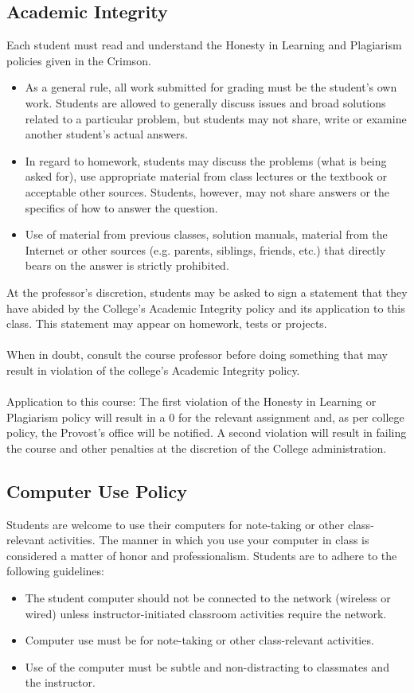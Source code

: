 \documentclass{article}
\begin{document}
\subsection{Academic Integrity}
Each student must read and understand the Honesty in Learning and Plagiarism policies given in the Crimson.
\\
\begin{itemize}
  \item As a general rule, all work submitted for grading must be the student's own work.  Students are allowed to generally discuss issues and broad solutions related to a particular problem, but students may not share, write or examine another student's actual answers.
  \item In regard to homework, students may discuss the problems (what is being asked for), use appropriate material from class lectures or the textbook or acceptable other sources.  Students, however, may not share answers or the specifics of how to answer the question.
  \item Use of material from previous classes, solution manuals, material from the Internet or other sources (e.g. parents, siblings, friends, etc.) that directly bears on the answer is strictly prohibited.
\end{itemize}
At the professor's discretion, students may be asked to sign a statement that they have abided by the College's Academic Integrity policy and its application to this class.  This statement may appear on homework, tests or projects.
\\ \\
When in doubt, consult the course professor before doing something that may result in violation of the college's Academic Integrity policy.
\\ \\
Application to this course: The first violation of the Honesty in Learning or Plagiarism policy will result in a 0 for the relevant assignment and, as per college policy, the Provost's office will be notified.  A second violation will result in failing the course and other penalties at the discretion of the College administration.

\subsection{Computer Use Policy}
Students are welcome to use their computers for note-taking or other class-relevant activities. The manner in which you use your computer in class is considered a matter of honor and professionalism. Students are to adhere to the following guidelines:
\\
\begin{itemize}
  \item The student computer should not be connected to the network (wireless or wired) unless instructor-initiated classroom activities require the network.
  \item Computer use must be for note-taking or other class-relevant activities.
  \item Use of the computer must be subtle and non-distracting to classmates and the instructor.
\end{itemize}
\end{document}
